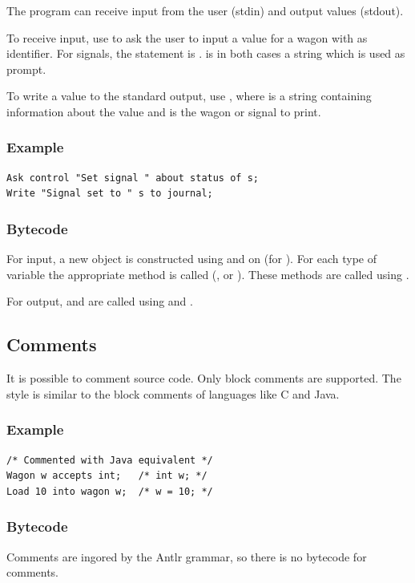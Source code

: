 The program can receive input from the user (stdin) and output values (stdout).

To receive input, use  to ask the user to input a value for a wagon with  as identifier. For signals, the statement is .  is in both cases a string which is used as prompt.

To write a value to the standard output, use , where  is a string containing information about the value and  is the wagon or signal to print.

\subsubsection*{Example}

\begin{lstlisting}
Ask control "Set signal " about status of s;
Write "Signal set to " s to journal;
\end{lstlisting}

\subsubsection*{Bytecode}

For input, a new  object is constructed using  and  on  (for ). For each type of variable the appropriate method is called (,  or ). These methods are called using .

For output,  and  are called using  and .

\subsection{Comments}

It is possible to comment source code. Only block comments are supported. The style is similar to the block comments of languages like C and Java.

\subsubsection*{Example}

\begin{lstlisting}
/* Commented with Java equivalent */
Wagon w accepts int;   /* int w; */
Load 10 into wagon w;  /* w = 10; */
\end{lstlisting}

\subsubsection*{Bytecode}

Comments are ingored by the Antlr grammar, so there is no bytecode for comments.
